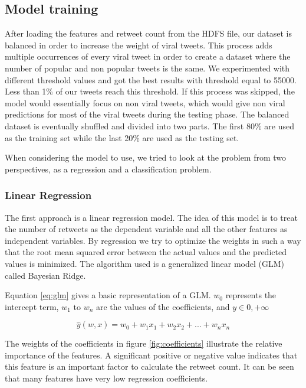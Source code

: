 \subsection{Model training}
After loading the features and retweet count from the HDFS file, our dataset is balanced in order to increase the weight of viral tweets. This process adds multiple occurrences of every viral tweet in order to create a dataset where the number of popular and non popular tweets is the same. We experimented with different threshold values and got the best results with threshold equal to 55000. Less than 1\% of our tweets reach this threshold. If this process was skipped, the model would essentially focus on non viral tweets, which would give non viral predictions for most of the viral tweets during the testing phase. The balanced dataset is eventually shuffled and divided into two parts. The first 80\% are used as the training set while the last 20\% are used as the testing set.

When considering the model to use, we tried to look at the problem from two perspectives, as a regression and a classification problem. 

\subsubsection{Linear Regression}
The first approach is a linear regression model. The idea of this model is to treat the number of retweets as the dependent variable and all the other features as independent variables. By regression we try to optimize the weights in such a way that the root mean squared error between the actual values and the predicted values is minimized. The algorithm used is a generalized linear model (GLM) called Bayesian Ridge. 

Equation \ref{eq:glm} gives a basic representation of a GLM. $w_0$ represents the intercept term, $w_1$  to  $w_n$ are the values of the coefficients, and $y \in {0,+\infty}$ 

\begin{equation}
\hat{y}(w,x) = w_0 + w_1 x_1 + w_2 x_2 + ... + w_n x_n
\label{eq:glm}
\end{equation}

The weights of the coefficients in figure \ref{fig:coefficients} illustrate the relative importance of the features. A significant positive or negative value indicates that this feature is an important factor to calculate the retweet count. It can be seen that many features have very low regression coefficients. 


